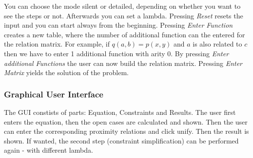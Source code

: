 \documentclass{article}
\begin{document}
You can choose the mode silent or detailed, depending on whether you want to see the steps or not. Afterwards you can set a lambda. Pressing \textit{Reset} resets the input and you can start always from the beginning. Pressing \textit{Enter Function} creates a new table, where the number of additional function can the entered for the relation matrix. For example, if $q(a,b)=p(x,y)$ and $a$ is also related to $c$ then we have to enter 1 additional function with arity 0. By pressing \textit{Enter additional Functions} the user can now build the relation matrix. Pressing \textit{Enter Matrix} yields the solution of the problem.

\subsubsection{Graphical User Interface}

The GUI constists of parts: Equation, Constraints and Results. The user first enters the equation, then the open cases are calculated and shown. Then the user can enter the corresponding proximity relations and click unify. Then the result is shown. If wanted, the second step (constraint simplification) can be performed again - with different lambda.
\end{document}
